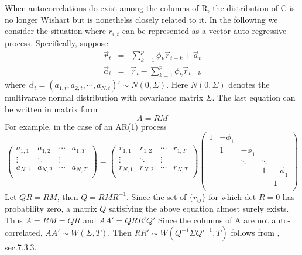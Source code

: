 \documentclass{book}
\begin{document}
When autocorrelations do exist among the columns of R, the
distribution of C is no longer Wishart but is nonethelss closely
related to it. In the following we consider the situation where
$r_{i,t}$ can be represented as a vector auto-regressive
process. Specifically, suppose
\begin{eqnarray*}
  \vec{r}_t &=& \sum_{k=1}^p \phi_k \vec{r}_{t-k} + \vec{a}_t \\
  \vec{a}_t &=& \vec{r}_t - \sum_{k=1}^p \phi_k \vec{r}_{t-k}
\end{eqnarray*}
where $\vec{a}_t = (a_{1,t}, a_{2,t}, \cdots, a_{N,t})' \sim N(0,
\Sigma)$. Here $N(0, \Sigma)$ denotes the multivarate normal
distribution with covariance matrix $\Sigma$. The last equation can be
written in matrix form
\[
A = R M
\]
For example, in the case of an AR(1) process
\begin{equation*}
  \begin{pmatrix}
    a_{1,1} & a_{1,2} & \cdots & a_{1,T} \\
    \vdots & \ddots & \vdots \\
    a_{N,1} & a_{N,2} & \cdots & a_{N,T} \\
  \end{pmatrix} =
  \begin{pmatrix}
    r_{1,1} & r_{1,2} & \cdots & r_{1,T} \\
    \vdots & \ddots & \vdots \\
    r_{N,1} & r_{N,2} & \cdots & r_{N,T} \\
  \end{pmatrix}
  \begin{pmatrix}
    1 & -\phi_1 &   &   & \\
      & 1 & -\phi_1 &   & \\
      &   & \ddots  & \ddots &   \\
      &   &   & 1 & -\phi_1 \\
      &   &   &   & 1 \\
  \end{pmatrix}
\end{equation*}
Let $QR = RM$, then $Q = RMR^{-1}$. Since the set of $\{r_{ij}\}$ for
which $\text{det } R = 0$ has probability zero, a matrix $Q$
satisfying the above equation almost surely exists. Thus $A = RM =
QR$ and $AA' = QRR'Q'$ Since the columns of A are not auto-correlated,
$AA' \sim W(\Sigma, T)$. Then $RR' \sim W(Q^{-1} \Sigma Q'^{-1}, T)$
follows from \cite{Anderson2003}, sec.7.3.3.
\end{document}
